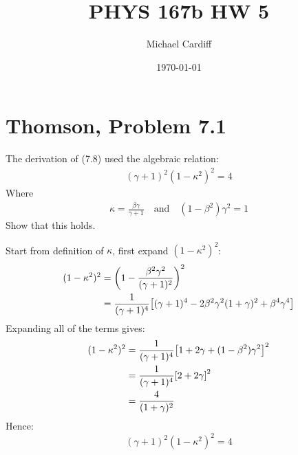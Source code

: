 \documentclass[12pt]{article}
\title{\vspace{-3em}PHYS 167b HW 5}
\author{Michael Cardiff}
\date{\today}
\begin{document}
\maketitle
\section{Thomson, Problem 7.1}
\begin{problem}
  The derivation of (7.8) used the algebraic relation:
  \begin{align*}
    (\gamma+1)^2(1-\kappa^2)^2=4
  \end{align*}
  Where
  \begin{align*}
    \kappa=\frac{\beta\gamma}{\gamma+1}\quad\text{and}\quad
    (1-\beta^2)\gamma^2=1
  \end{align*}
  Show that this holds.
\end{problem}
Start from definition of $\kappa$, first expand $(1-\kappa^2)^2$:
\begin{align*}
  (1-\kappa^2)^2&=\qty(1-\frac{\beta^2\gamma^2}{(\gamma+1)^2})^2\\
  &=\frac1{(\gamma+1)^4}\qty[
  (\gamma+1)^4-2\beta^2\gamma^2(1+\gamma)^2+\beta^4\gamma^4
  ]
\end{align*}
Expanding all of the terms gives:
\begin{align*}
  (1-\kappa^2)^2&=\frac1{(\gamma+1)^4}\qty[
  1+2\gamma+(1-\beta^2)\gamma^2]^2\\
  &=\frac1{(\gamma+1)^4}\qty[2+2\gamma]^2\\
  &=\frac4{(1+\gamma)^2}
\end{align*}
Hence:
\begin{equation}
  \label{eq:p1}
  \boxed{(\gamma+1)^2(1-\kappa^2)^2=4}
\end{equation}
\newpage
\end{document}
